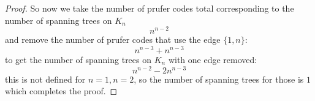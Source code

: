 \documentclass{article}
\begin{document}
\begin{proof}
        So now we take the number of prufer codes total corresponding to the number of spanning trees on $K_{n}$
            \begin{equation*}
                n^{n - 2}
            \end{equation*}
        and remove the number of prufer codes that use the edge $\{1, n\}$:
            \begin{equation*}
                n^{n - 3} + n^{n - 3}
            \end{equation*}
        to get the number of spanning trees on $K_{n}$ with one edge removed:
            \begin{equation*}
                n^{n - 2} - 2n^{n - 3}
            \end{equation*}
        this is not defined for $n = 1, n = 2$, so the number of spanning trees for those is $1$ which completes the proof.
    \end{proof}
\end{document}
